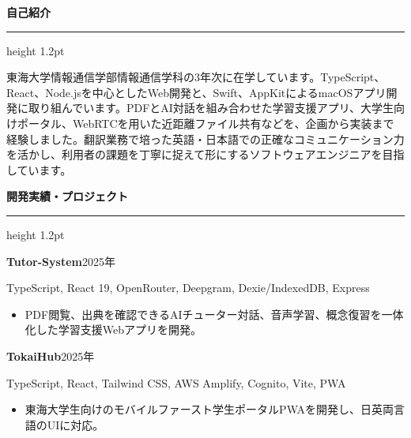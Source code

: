 \documentclass[9.5pt, a4paper]{article}
\newcommand{\rightsection}[1]{%
  \vspace{10pt}
  {\fontsize{11.5}{13.5}\selectfont\textcolor{sectioncolor}{\textbf{#1}}}\par
  \vspace{3pt}
  {\color{sectioncolor}\hrule height 1.2pt}\par
  \vspace{6pt}
}
\begin{document}
\begin{minipage}[t][0.96\textheight][t]{0.63\textwidth}
  \vspace*{12pt}
  \begin{minipage}[t]{\linewidth}
    \color{bodycolor}
    
    \rightsection{自己紹介}
    {\fontsize{9}{13}\selectfont
    東海大学情報通信学部情報通信学科の3年次に在学しています。TypeScript、React、Node.jsを中心としたWeb開発と、Swift、AppKitによるmacOSアプリ開発に取り組んでいます。PDFとAI対話を組み合わせた学習支援アプリ、大学生向けポータル、WebRTCを用いた近距離ファイル共有などを、企画から実装まで経験しました。翻訳業務で培った英語・日本語での正確なコミュニケーション力を活かし、利用者の課題を丁寧に捉えて形にするソフトウェアエンジニアを目指しています。
    }
    
    \vspace{6pt}
    \rightsection{開発実績・プロジェクト}
    
    \noindent
    \begin{minipage}[t]{\linewidth}
      \textbf{\fontsize{9.5}{11.5}\selectfont Tutor-System}\hfill\textcolor{bodycolor}{\fontsize{8}{10}\selectfont 2025年}\par\vspace{2pt}
      \textcolor{bodycolor}{\fontsize{8}{10}\selectfont TypeScript, React 19, OpenRouter, Deepgram, Dexie/IndexedDB, Express}\par\vspace{2pt}
      \begin{itemize}[leftmargin=1.2em, itemsep=1pt, topsep=1pt, parsep=0pt]
        \fontsize{8.2}{11.5}\selectfont
        \item PDF閲覧、出典を確認できるAIチューター対話、音声学習、概念復習を一体化した学習支援Webアプリを開発。
      \end{itemize}
    \end{minipage}
    \vspace{5pt}

    \noindent
    \begin{minipage}[t]{\linewidth}
      \textbf{\fontsize{9.5}{11.5}\selectfont TokaiHub}\hfill\textcolor{bodycolor}{\fontsize{8}{10}\selectfont 2025年}\par\vspace{2pt}
      \textcolor{bodycolor}{\fontsize{8}{10}\selectfont TypeScript, React, Tailwind CSS, AWS Amplify, Cognito, Vite, PWA}\par\vspace{2pt}
      \begin{itemize}[leftmargin=1.2em, itemsep=1pt, topsep=1pt, parsep=0pt]
        \fontsize{8.2}{11.5}\selectfont
        \item 東海大学生向けのモバイルファースト学生ポータルPWAを開発し、日英両言語のUIに対応。
      \end{itemize}
    \end{minipage}
    \vspace{5pt}


\end{minipage}
\end{minipage}
\end{document}
